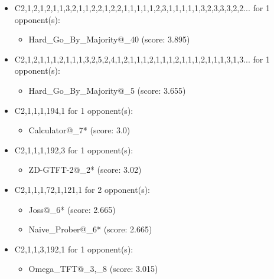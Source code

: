 \begin{appendices}
\begin{itemize}
    \item C2,1,2,1,2,1,1,3,2,1,1,2,2,1,2,2,1,1,1,1,1,2,3,1,1,1,1,1,3,2,3,3,3,2,2... for 1 opponent(s):
    \begin{multicols}{3}
         \begin{itemize}
            \item Hard\_Go\_By\_Majority@\_40 (score: 3.895)
        \end{itemize}
     \end{multicols}
     
    \item C2,1,2,1,1,1,2,1,1,1,3,2,5,2,4,1,2,1,1,1,2,1,1,1,2,1,1,1,2,1,1,1,3,1,3... for 1 opponent(s):
    \begin{multicols}{3}
         \begin{itemize}
            \item Hard\_Go\_By\_Majority@\_5 (score: 3.655)
        \end{itemize}
     \end{multicols}
     
    \item C2,1,1,1,194,1 for 1 opponent(s):
    \begin{multicols}{3}
         \begin{itemize}
            \item Calculator@\_7* (score: 3.0)
        \end{itemize}
     \end{multicols}
     
    \item C2,1,1,1,192,3 for 1 opponent(s):
    \begin{multicols}{3}
         \begin{itemize}
            \item ZD-GTFT-2@\_2* (score: 3.02)
        \end{itemize}
     \end{multicols}
     
    \item C2,1,1,1,72,1,121,1 for 2 opponent(s):
    \begin{multicols}{3}
         \begin{itemize}
            \item Joss@\_6* (score: 2.665)
            \item Naive\_Prober@\_6* (score: 2.665)
        \end{itemize}
     \end{multicols}
     
    \item C2,1,1,3,192,1 for 1 opponent(s):
    \begin{multicols}{3}
         \begin{itemize}
            \item Omega\_TFT@\_3,\_8 (score: 3.015)
        \end{itemize}
     \end{multicols}
     

\end{itemize}
\end{appendices}
